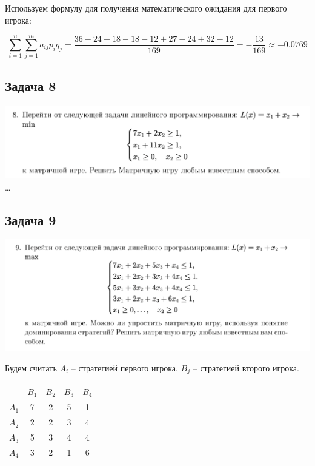 \documentclass[11pt, a4paper]{article}
\begin{document}
    Используем формулу для получения математического ожидания для первого игрока:

    \begin{equation}
        \sum_{i=1}^n \sum_{j=1}^m a_{ij} p_i q_j =
        \frac{36 - 24 - 18 - 18 - 12 + 27 - 24 + 32 - 12}{169} =
        -\frac{13}{169} \approx -0.0769\label{eq:equation20}
    \end{equation}

    \newpage

    \subsection{Задача 8}\label{subsec:task8}
    \includegraphics[width=1\textwidth]{docs/8}
    \dots

    \newpage

    \subsection{Задача 9}\label{subsec:task9}
    \includegraphics[width=1\textwidth]{docs/9}

    Будем считать $A_i$ -- стратегией первого игрока, $B_j$ -- стратегией второго игрока.

    \begin{table}[h]
        \centering
        \begin{tabular}{|c|c|c|c|c|}
            \hline       & $B_1$ & $B_2$ & $B_3$ & $B_4$ \\
            \hline $A_1$ & 7     & 2     & 5     & 1     \\
            \hline $A_2$ & 2     & 2     & 3     & 4     \\
            \hline $A_3$ & 5     & 3     & 4     & 4     \\
            \hline $A_4$ & 3     & 2     & 1     & 6     \\
            \hline
        \end{tabular}\label{tab:table3}
    \end{table}
\end{document}
